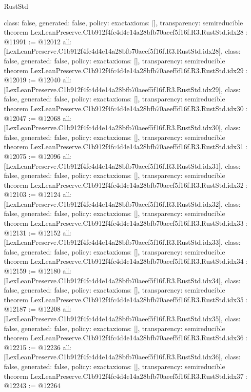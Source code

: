 \begin{lexlean}{RustStd}
\begin{coremodule}
{  class: false,
  generated: false,
  policy: exact{axioms: []},
  transparency: semireducible
}
theorem LexLeanPreserve.C1b912f4fc4d4e14a28bfb70aeef5f16f.R3.RustStd.idx28 : @11991 := @12012 {
  all: [LexLeanPreserve.C1b912f4fc4d4e14a28bfb70aeef5f16f.R3.RustStd.idx28],
  class: false,
  generated: false,
  policy: exact{axioms: []},
  transparency: semireducible
}
theorem LexLeanPreserve.C1b912f4fc4d4e14a28bfb70aeef5f16f.R3.RustStd.idx29 : @12019 := @12040 {
  all: [LexLeanPreserve.C1b912f4fc4d4e14a28bfb70aeef5f16f.R3.RustStd.idx29],
  class: false,
  generated: false,
  policy: exact{axioms: []},
  transparency: semireducible
}
theorem LexLeanPreserve.C1b912f4fc4d4e14a28bfb70aeef5f16f.R3.RustStd.idx30 : @12047 := @12068 {
  all: [LexLeanPreserve.C1b912f4fc4d4e14a28bfb70aeef5f16f.R3.RustStd.idx30],
  class: false,
  generated: false,
  policy: exact{axioms: []},
  transparency: semireducible
}
theorem LexLeanPreserve.C1b912f4fc4d4e14a28bfb70aeef5f16f.R3.RustStd.idx31 : @12075 := @12096 {
  all: [LexLeanPreserve.C1b912f4fc4d4e14a28bfb70aeef5f16f.R3.RustStd.idx31],
  class: false,
  generated: false,
  policy: exact{axioms: []},
  transparency: semireducible
}
theorem LexLeanPreserve.C1b912f4fc4d4e14a28bfb70aeef5f16f.R3.RustStd.idx32 : @12103 := @12124 {
  all: [LexLeanPreserve.C1b912f4fc4d4e14a28bfb70aeef5f16f.R3.RustStd.idx32],
  class: false,
  generated: false,
  policy: exact{axioms: []},
  transparency: semireducible
}
theorem LexLeanPreserve.C1b912f4fc4d4e14a28bfb70aeef5f16f.R3.RustStd.idx33 : @12131 := @12152 {
  all: [LexLeanPreserve.C1b912f4fc4d4e14a28bfb70aeef5f16f.R3.RustStd.idx33],
  class: false,
  generated: false,
  policy: exact{axioms: []},
  transparency: semireducible
}
theorem LexLeanPreserve.C1b912f4fc4d4e14a28bfb70aeef5f16f.R3.RustStd.idx34 : @12159 := @12180 {
  all: [LexLeanPreserve.C1b912f4fc4d4e14a28bfb70aeef5f16f.R3.RustStd.idx34],
  class: false,
  generated: false,
  policy: exact{axioms: []},
  transparency: semireducible
}
theorem LexLeanPreserve.C1b912f4fc4d4e14a28bfb70aeef5f16f.R3.RustStd.idx35 : @12187 := @12208 {
  all: [LexLeanPreserve.C1b912f4fc4d4e14a28bfb70aeef5f16f.R3.RustStd.idx35],
  class: false,
  generated: false,
  policy: exact{axioms: []},
  transparency: semireducible
}
theorem LexLeanPreserve.C1b912f4fc4d4e14a28bfb70aeef5f16f.R3.RustStd.idx36 : @12215 := @12236 {
  all: [LexLeanPreserve.C1b912f4fc4d4e14a28bfb70aeef5f16f.R3.RustStd.idx36],
  class: false,
  generated: false,
  policy: exact{axioms: []},
  transparency: semireducible
}
theorem LexLeanPreserve.C1b912f4fc4d4e14a28bfb70aeef5f16f.R3.RustStd.idx37 : @12243 := @12264 {
}
\end{coremodule}
\end{lexlean}
